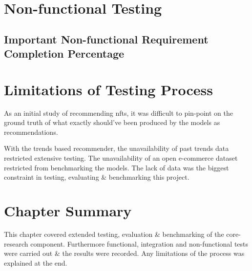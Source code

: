 \section{Non-functional Testing}



\subsection{Important Non-functional Requirement Completion Percentage}


\section{Limitations of Testing Process}

As an initial study of recommending \gls{nft}s, it was difficult to pin-point on the ground truth of what exactly should've been produced by the models as recommendations. 

With the trends based recommender, the unavailability of past trends data restricted extensive testing. The unavailability of an open e-commerce dataset restricted from benchmarking the models. The lack of data was the biggest constraint in testing, evaluating \& benchmarking this project.

\section{Chapter Summary}
This chapter covered extended testing, evaluation \& benchmarking of the core-research component. Furthermore functional, integration and non-functional tests were carried out \& the results were recorded. Any limitations of the process was explained at the end.